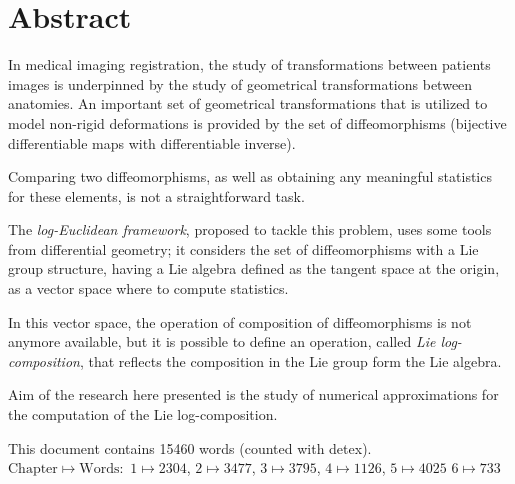 
\qquad
\pagestyle{empty}
\newpage



\section*{Abstract}


In medical imaging registration, the study of transformations between patients images is underpinned by the study of geometrical transformations between anatomies. An important set of geometrical transformations that is utilized to model non-rigid deformations is provided by the set of diffeomorphisms (bijective differentiable maps with differentiable inverse).

Comparing two diffeomorphisms, as well as obtaining any meaningful statistics for these elements, is not a straightforward task.

The \emph{log-Euclidean framework}, proposed to tackle this problem, uses some tools from differential geometry; it considers the set of diffeomorphisms with a Lie group structure, having a Lie algebra defined as the tangent space at the origin, as a vector space where to compute statistics.

In this vector space, the operation of composition of diffeomorphisms is not anymore available, but it is possible to define an operation, called \emph{Lie log-composition}, that reflects the composition in the Lie group form the Lie algebra.

Aim of the research here presented is the study of numerical approximations for the computation of the Lie log-composition. 


\vspace{1cm}

\noindent
This document contains 15460 words (counted with detex).\\
$ \text{Chapter} \mapsto \text{Words}:$ 
$1 \mapsto 2304$,
$2 \mapsto 3477 $,
$3 \mapsto 3795 $,
$4 \mapsto 1126 $,
$5 \mapsto 4025$
$6 \mapsto 733$

\qquad
\pagestyle{empty}
\newpage


